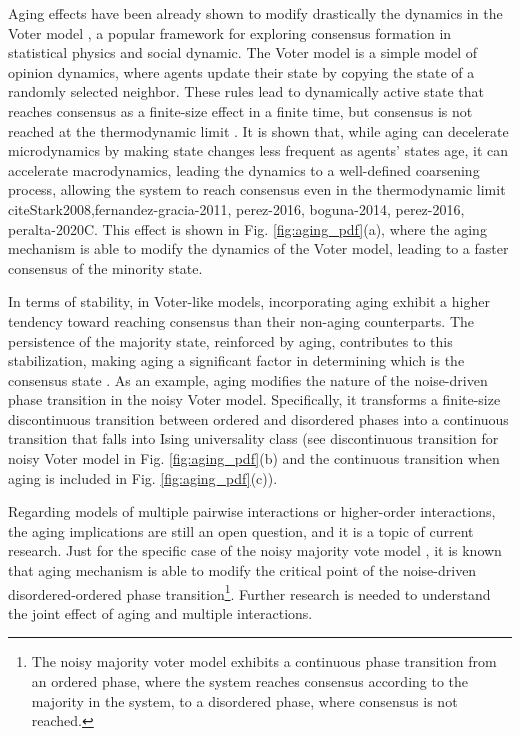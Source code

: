 Aging effects have been already shown to modify drastically the dynamics in the Voter model \cite{Voter-original}, a popular framework for exploring consensus formation in statistical physics and social dynamic. The Voter model is a simple model of opinion dynamics, where agents update their state by copying the state of a randomly selected neighbor. These rules lead to dynamically active state that reaches consensus as a finite-size effect in a finite time, but consensus is not reached at the thermodynamic limit \cite{Voter-original}. It is shown that, while aging can decelerate microdynamics by making state changes less frequent as agents' states age, it can accelerate macrodynamics, leading the dynamics to a well-defined coarsening process, allowing the system to reach consensus even in the thermodynamic limit cite{Stark2008,fernandez-gracia-2011, perez-2016, boguna-2014, perez-2016, peralta-2020C}. This effect is shown in Fig. \ref{fig:aging_pdf}(a), where the aging mechanism is able to modify the dynamics of the Voter model, leading to a faster consensus of the minority state.

In terms of stability, in Voter-like models, incorporating aging exhibit a higher tendency toward reaching consensus than their non-aging counterparts. The persistence of the majority state, reinforced by aging, contributes to this stabilization, making aging a significant factor in determining which is the consensus state \cite{artime2019herding, peralta-2020C, baron2022analytical}. As an example, aging modifies the nature of the noise-driven phase transition in the noisy Voter model. Specifically, it transforms a finite-size discontinuous transition between ordered and disordered phases into a continuous transition that falls into Ising universality class \cite{artime-2018} (see discontinuous transition for noisy Voter model in Fig. \ref{fig:aging_pdf}(b) and the continuous transition when aging is included in Fig. \ref{fig:aging_pdf}(c)).

Regarding models of multiple pairwise interactions or higher-order interactions, the aging implications are still an open question, and it is a topic of current research. Just for the specific case of the noisy majority vote model \cite{chen-2020}, it is known that aging mechanism is able to modify the critical point of the noise-driven disordered-ordered phase transition\footnote{\sffamily\small The noisy majority voter model exhibits a continuous phase transition from an ordered phase, where the system reaches consensus according to the majority in the system, to a disordered phase, where consensus is not reached.}. Further research is needed to understand the joint effect of aging and multiple interactions.